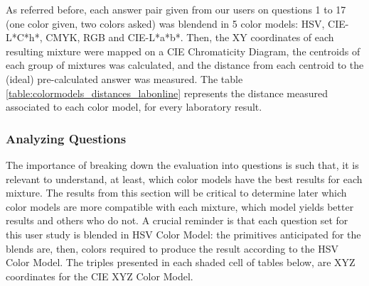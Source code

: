 %
As referred before, each answer pair given from our users on questions 1 to 17 (one color given, two colors asked) was blendend in 5 color models: HSV, CIE-L*C*h*, CMYK, RGB and CIE-L*a*b*. Then, the XY coordinates of each resulting
mixture were mapped on a CIE Chromaticity Diagram, the centroids of each group of mixtures was calculated, and the distance from each centroid to the (ideal) pre-calculated answer was measured. The table \ref{table:colormodels_distances_labonline}
represents the distance measured associated to each color model, for every laboratory result. \par
%
%
\subsubsection{Analyzing Questions}
\label{subsubsec:questions_analyzing}
%
The importance of breaking down the evaluation into questions is such that, it is relevant to understand, at least, which color models have the best results for each mixture. The results from this section will be critical
to determine later which color models are more compatible with each mixture, which model yields better results and others who do not. A crucial reminder is that each question set for this user study is blended in HSV Color
Model: the primitives anticipated for the blends are, then, colors required to produce the result according to the HSV Color Model. The triples presented in each shaded cell of tables below, are XYZ coordinates for the CIE
XYZ Color Model. \par
%
